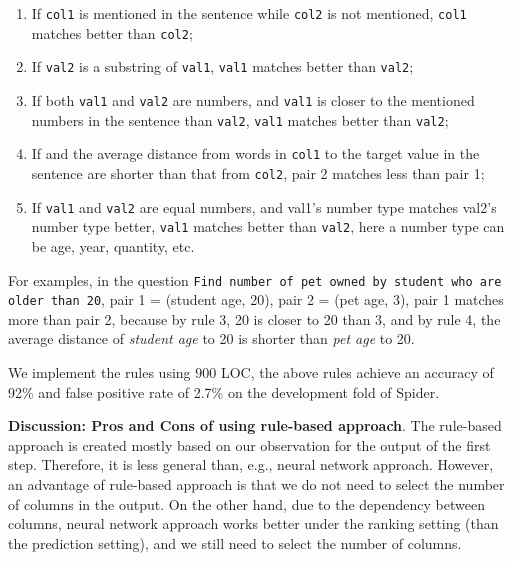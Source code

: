 \begin{enumerate}
\item If \texttt{col1} is mentioned in the sentence while \texttt{col2} is not mentioned, \texttt{col1} matches better than \texttt{col2};
\item If \texttt{val2} is a substring of \texttt{val1}, \texttt{val1} matches better than \texttt{val2};
\item If both \texttt{val1} and \texttt{val2} are numbers, and \texttt{val1} is closer to the mentioned numbers in the sentence than \texttt{val2}, \texttt{val1} matches better than \texttt{val2}; 
\item If and the average distance from words in \texttt{col1} to the target value in the sentence are shorter than that from \texttt{col2}, pair 2 matches less than pair 1;
\item If \texttt{val1} and \texttt{val2} are equal numbers, and val1's number type matches val2's number type better, \texttt{val1} matches better than \texttt{val2}, here a number type can be age, year, quantity, etc.
\end{enumerate}

For examples, in the question \texttt{Find number of pet owned by student who are older than 20}, pair 1 = (student age, 20), pair 2 = (pet age, 3), pair 1 matches more than pair 2, because by rule 3, 20 is closer to 20 than 3, and by rule 4, the average distance of \emph{student age} to 20 is shorter than \emph{pet age} to 20. 

We implement the rules using 900 LOC, the above rules achieve an accuracy of 92\% and false positive rate of 2.7\% on the development fold of Spider.

\textbf{Discussion: Pros and Cons of using rule-based approach}. The rule-based approach is created mostly based on our observation for the output of the first step. Therefore, it is less general than, e.g., neural network approach. However, an advantage of rule-based approach is that we do not need to select the number of columns in the output. On the other hand, due to the dependency between columns, neural network approach works better under the ranking setting (than the prediction setting), and we still need to select the number of columns. 
